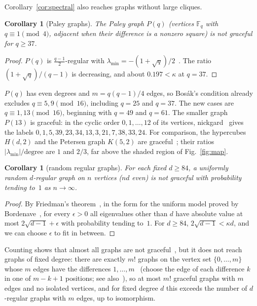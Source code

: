 \documentclass[11pt]{amsart}
\newcommand{\thmmarker}{}
\newcommand{\mnew}{\gdef\thmmarker{\textsuperscript{$\star$}}}
\theoremstyle{tplain}
\newtheorem{corollary}[theorem]{Corollary}
\theoremstyle{tdefinition}
\theoremstyle{tremark}
\newcommand{\lmin}{\lambda_{\min}}
\begin{document}
Corollary~\ref{cor:spectral} also reaches graphs without large cliques.

\mnew\begin{corollary}[Paley graphs]\label{cor:paley}
The Paley graph $P(q)$ (vertices $\mathbb F_q$ with $q\equiv1\pmod4$, adjacent
when their difference is a nonzero square) is not graceful for $q\ge37$.
\end{corollary}

\begin{proof}
$P(q)$ is $\frac{q-1}2$-regular with $\lmin=-(1+\sqrt q)/2$~\cite{bh}. The
ratio $(1+\sqrt q)/(q-1)$ is decreasing, and about $0.197<\kappa$ at $q=37$.
\end{proof}

$P(q)$ has even degrees and $m=q(q-1)/4$
edges, so Bos\'ak's condition already excludes $q\equiv5,9\pmod{16}$, including
$q=25$ and $q=37$. The new cases are $q\equiv1,13\pmod{16}$, beginning with
$q=49$ and $q=61$. The smaller graph $P(13)$ is graceful: in the cyclic
order $0,1,\dots,12$ of its vertices, nickgard~\cite{paley13} gives the labels
$0,1,5,39,23,34,13,3,21,7,38,33,24$. For comparison, the hypercubes $H(d,2)$ and the Petersen
graph $K(5,2)$ are graceful~\cite{gallian}; their ratios $|\lmin|/\text{degree}$ are $1$ and $2/3$, far above the shaded
region of Fig.~\ref{fig:map}.

\mnew\begin{corollary}[random regular graphs]\label{cor:random}
For each fixed $d\ge84$, a uniformly random $d$-regular graph on $n$ vertices
($nd$ even) is not graceful with probability tending to~$1$ as $n\to\infty$.
\end{corollary}

\begin{proof}
By Friedman's theorem~\cite{friedman}, in the form for the uniform model
proved by Bordenave~\cite{bordenave}, for every $\epsilon>0$ all eigenvalues
other than $d$ have absolute value at most $2\sqrt{d-1}+\epsilon$ with
probability tending to~$1$. For $d\ge84$, $2\sqrt{d-1}<\kappa d$, and we can
choose $\epsilon$ to fit in between.
\end{proof}

Counting shows that almost all graphs are not graceful~\cite{gallian}, but
it does not reach graphs of fixed degree: there are exactly $m!$ graphs on
the vertex set $\{0,\dots,m\}$ whose $m$ edges have the differences
$1,\dots,m$~\cite{sheppard} (choose the edge of each difference $k$ in one of
$m-k+1$ positions; see also~\cite[\S7.2.2.3, Theorem~S]{knuth-pre}), so at
most $m!$ graceful graphs with $m$ edges and no isolated vertices, and for
fixed degree $d$ this exceeds the number of $d$-regular graphs with $m$
edges, up to isomorphism.
\end{document}
